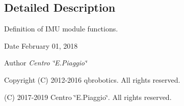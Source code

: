 \subsection{Detailed Description}
Definition of I\+MU module functions. 

\begin{DoxyDate}{Date}
February 01, 2018 
\end{DoxyDate}
\begin{DoxyAuthor}{Author}
{\itshape Centro \char`\"{}\+E.\+Piaggio\char`\"{}} 
\end{DoxyAuthor}
\begin{DoxyCopyright}{Copyright}
(C) 2012-\/2016 qbrobotics. All rights reserved. 

(C) 2017-\/2019 Centro \char`\"{}\+E.\+Piaggio\char`\"{}. All rights reserved. 
\end{DoxyCopyright}
